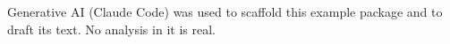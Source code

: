 Generative AI (Claude Code) was used to scaffold this example package and to
draft its text. No analysis in it is real.
